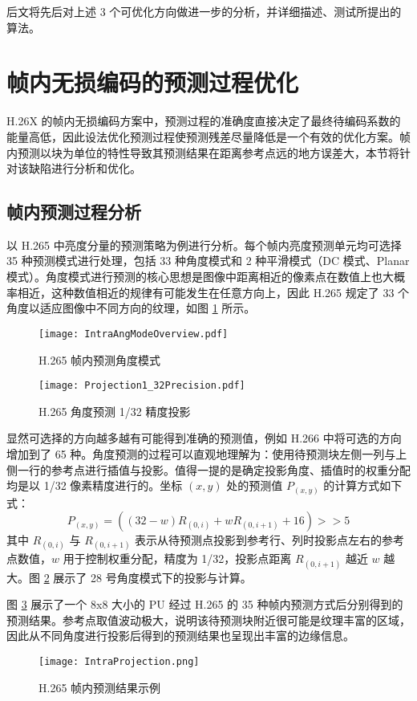 后文将先后对上述 3 个可优化方向做进一步的分析，并详细描述、测试所提出的算法。

\section{帧内无损编码的预测过程优化}
H.26X 的帧内无损编码方案中，预测过程的准确度直接决定了最终待编码系数的能量高低，因此设法优化预测过程使预测残差尽量降低是一个有效的优化方案。帧内预测以块为单位的特性导致其预测结果在距离参考点远的地方误差大，本节将针对该缺陷进行分析和优化。

\subsection{帧内预测过程分析}
\label{cha:IntraPredDetail}
以 H.265 中亮度分量的预测策略为例进行分析。每个帧内亮度预测单元均可选择 35 种预测模式进行处理，包括 33 种角度模式和 2 种平滑模式（DC 模式、Planar 模式）。角度模式进行预测的核心思想是图像中距离相近的像素点在数值上也大概率相近，这种数值相近的规律有可能发生在任意方向上，因此 H.265 规定了 33 个角度以适应图像中不同方向的纹理，如图 \ref{fig:IntraAngModeOverview} 所示。
\begin{figure}[hbt]
    \centering
    \texttt{[image: IntraAngModeOverview.pdf]}
    \caption{H.265 帧内预测角度模式}
    \label{fig:IntraAngModeOverview}
\end{figure}
\begin{figure}[hbt]
    \centering
    \texttt{[image: Projection1\_32Precision.pdf]}
    \caption{H.265 角度预测 1/32 精度投影}
    \label{fig:Projection1_32Precision}
\end{figure}
显然可选择的方向越多越有可能得到准确的预测值，例如 H.266 中将可选的方向增加到了 65 种。角度预测的过程可以直观地理解为：使用待预测块左侧一列与上侧一行的参考点进行插值与投影。值得一提的是确定投影角度、插值时的权重分配均是以 1/32 像素精度进行的。坐标 $(x,y)$ 处的预测值 $P_{(x,y)}$ 的计算方式如下式： 
\begin{equation}
    P_{(x,y)}=((32-w)R_{(0,i)}+wR_{(0,i+1)}+16)>>5
    \label{equ:IntraProjection}
\end{equation}
其中 $R_{(0,i)}$ 与 $R_{(0,i+1)}$ 表示从待预测点投影到参考行、列时投影点左右的参考点数值，$w$ 用于控制权重分配，精度为 1/32，投影点距离 $R_{(0,i+1)}$ 越近 $w$ 越大。图 \ref{fig:Projection1_32Precision} 展示了 28 号角度模式下的投影与计算。

图 \ref{fig:IntraProjection} 展示了一个 8x8 大小的 PU 经过 H.265 的 35 种帧内预测方式后分别得到的预测结果。参考点取值波动极大，说明该待预测块附近很可能是纹理丰富的区域，因此从不同角度进行投影后得到的预测结果也呈现出丰富的边缘信息。
\begin{figure}[hbt]
    \centering
    \texttt{[image: IntraProjection.png]}
    \caption{H.265 帧内预测结果示例}
    \label{fig:IntraProjection}
\end{figure}

